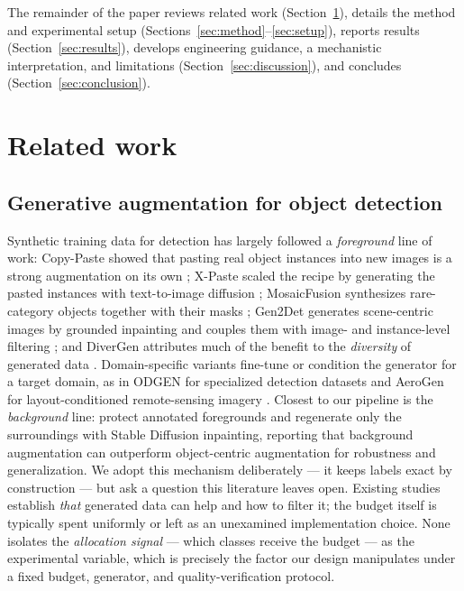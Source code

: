 \documentclass[preprint,12pt,authoryear]{elsarticle}
\begin{document}
The remainder of the paper reviews related work
(Section~\ref{sec:related}), details the method and experimental setup
(Sections~\ref{sec:method}--\ref{sec:setup}), reports results
(Section~\ref{sec:results}), develops engineering guidance, a
mechanistic interpretation, and limitations
(Section~\ref{sec:discussion}), and concludes
(Section~\ref{sec:conclusion}).

\section{Related work}\label{sec:related}

\subsection{Generative augmentation for object detection}

Synthetic training data for detection has largely followed a
\emph{foreground} line of work: Copy-Paste showed that pasting real
object instances into new images is a strong augmentation on its own
\citep{ghiasi2021copy}; X-Paste scaled the recipe by generating the
pasted instances with text-to-image diffusion \citep{zhao2023xpaste};
MosaicFusion synthesizes rare-category objects together with their masks
\citep{xie2024mosaicfusion}; Gen2Det generates scene-centric images by
grounded inpainting and couples them with image- and instance-level
filtering \citep{suri2023gen2det}; and DiverGen attributes much of the
benefit to the \emph{diversity} of generated data \citep{fan2024divergen}.
Domain-specific variants fine-tune or condition the generator for a
target domain, as in ODGEN for specialized detection datasets
\citep{zhu2024odgen} and AeroGen for layout-conditioned remote-sensing
imagery \citep{tang2025aerogen}. Closest to our pipeline is the
\emph{background} line: \citet{li2024background} protect annotated
foregrounds and regenerate only the surroundings with Stable Diffusion
inpainting, reporting that background augmentation can outperform
object-centric augmentation for robustness and generalization. We adopt
this mechanism deliberately --- it keeps labels exact by construction
--- but ask a question this literature leaves open. Existing studies
establish \emph{that} generated data can help and how to filter it; the
budget itself is typically spent uniformly or left as an unexamined
implementation choice. None isolates the \emph{allocation signal} ---
which classes receive the budget --- as the experimental variable, which
is precisely the factor our design manipulates under a fixed budget,
generator, and quality-verification protocol.
\end{document}
